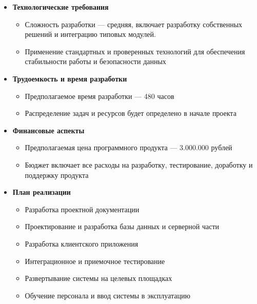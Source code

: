 \begin{itemize}
	\item \textbf{Технологические требования}
	\begin{itemize}
		\item Сложность разработки --- средняя, включает разработку собственных решений и интеграцию типовых модулей.
		\item Применение стандартных и проверенных технологий для обеспечения стабильности работы и безопасности данных
	\end{itemize}
	
	\item \textbf{Трудоемкость и время разработки}
	\begin{itemize}
		\item Предполагаемое время разработки --- 480 часов
		\item Распределение задач и ресурсов будет определено в начале проекта
	\end{itemize}
	
	\item \textbf{Финансовые аспекты}
	\begin{itemize}
		\item Предполагаемая цена программного продукта --- 3.000.000 рублей
		\item Бюджет включает все расходы на разработку, тестирование, доработку и поддержку продукта
	\end{itemize}
	
	\item \textbf{План реализации}
	\begin{itemize}
		\item Разработка проектной документации
		\item Проектирование и разработка базы данных и серверной части
		\item Разработка клиентского приложения
		\item Интеграционное и приемочное тестирование
		\item Развертывание системы на целевых площадках
		\item Обучение персонала и ввод системы в эксплуатацию
	\end{itemize}
\end{itemize}

